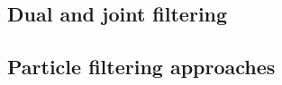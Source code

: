 \subsection{Dual and joint filtering}
\parencite{Haykin2001}
\subsection{Particle filtering approaches}
\parencite{Kantas2009,doucet2001sequential,Lindsten2010}
